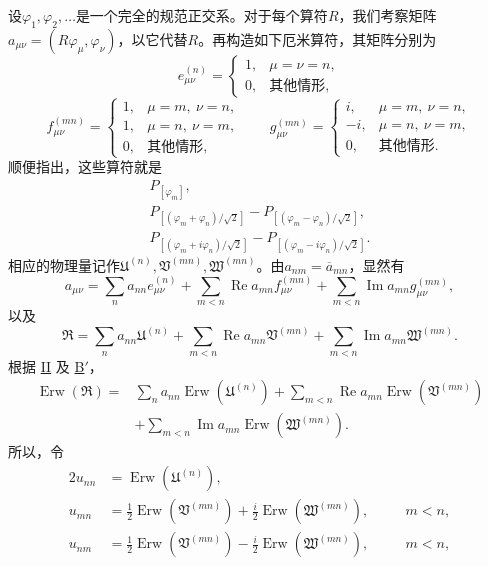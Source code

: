 \documentclass[fontsize=13pt,twoside,openany,headings=normal,parskip=false,bookmarkpackage=false,DIV=calc]{scrbook}
\begin{document}
设$\varphi_1,\allowbreak \varphi_2,\allowbreak \ldots$是一个完全的规范正交系。对于每个算符$R$，我们考察矩阵$a_{\mu\nu}=(R\varphi_\mu,\allowbreak \varphi_\nu)$，以它代替$R$。再构造如下厄米算符，其矩阵分别为
\[
e_{\mu\nu}^{(n)}=\begin{cases}1,&\mu=\nu=n,\\0,&\text{其他情形},\end{cases}
\]
\[
f_{\mu\nu}^{(mn)}=\begin{cases}1,&\mu=m,\ \nu=n,\\1,&\mu=n,\ \nu=m,\\0,&\text{其他情形},\end{cases}
\qquad
g_{\mu\nu}^{(mn)}=\begin{cases}i,&\mu=m,\ \nu=n,\\-i,&\mu=n,\ \nu=m,\\0,&\text{其他情形}.\end{cases}
\]
顺便指出，这些算符就是
\begin{gather*}
P_{[\varphi_m]},\\
P_{[(\varphi_m+\varphi_n)/\sqrt2]}-P_{[(\varphi_m-\varphi_n)/\sqrt2]},\\
P_{[(\varphi_m+i\varphi_n)/\sqrt2]}-P_{[(\varphi_m-i\varphi_n)/\sqrt2]}.
\end{gather*}
相应的物理量记作$\mathfrak U^{(n)},\allowbreak \mathfrak V^{(mn)},\allowbreak \mathfrak W^{(mn)}$。由$a_{nm}=\overline{a}_{mn}$，显然有
\[
a_{\mu\nu}=\sum_n a_{nn}e_{\mu\nu}^{(n)}
+\sum_{m<n}\operatorname{Re}a_{mn}f_{\mu\nu}^{(mn)}
+\sum_{m<n}\operatorname{Im}a_{mn}g_{\mu\nu}^{(mn)},
\]
以及
\[
\mathfrak R=\sum_n a_{nn}\mathfrak U^{(n)}
+\sum_{m<n}\operatorname{Re}a_{mn}\mathfrak V^{(mn)}
+\sum_{m<n}\operatorname{Im}a_{mn}\mathfrak W^{(mn)}.
\]
根据 \hyperref[cond:IV.2.II]{II} 及 \hyperref[cond:IV.Bprime]{B$'$}，
\begin{align*}
\operatorname{Erw}(\mathfrak R)={}&\sum_n a_{nn}\operatorname{Erw}(\mathfrak U^{(n)})
+\sum_{m<n}\operatorname{Re}a_{mn}\operatorname{Erw}(\mathfrak V^{(mn)})\\
&+\sum_{m<n}\operatorname{Im}a_{mn}\operatorname{Erw}(\mathfrak W^{(mn)}).
\end{align*}\hypertarget{origpage-168}{}\label{origpage-168}所以，令
\begin{alignat*}{2}
u_{nn}&=\operatorname{Erw}(\mathfrak U^{(n)}),\\
u_{mn}&=\tfrac12\operatorname{Erw}(\mathfrak V^{(mn)})+\tfrac i2\operatorname{Erw}(\mathfrak W^{(mn)}),&\quad &m<n,\\
u_{nm}&=\tfrac12\operatorname{Erw}(\mathfrak V^{(mn)})-\tfrac i2\operatorname{Erw}(\mathfrak W^{(mn)}),&\quad &m<n,
\end{alignat*}
\end{document}
